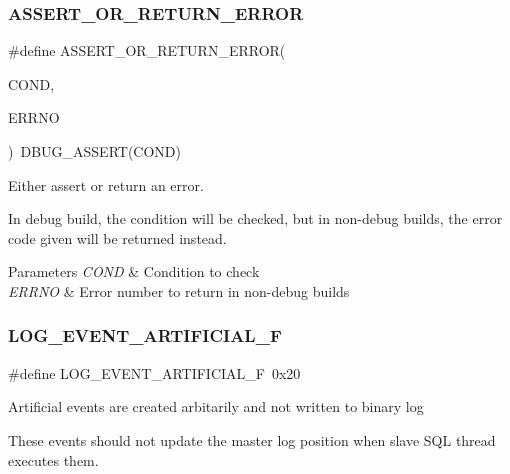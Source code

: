 \subsubsection{\texorpdfstring{A\+S\+S\+E\+R\+T\+\_\+\+O\+R\+\_\+\+R\+E\+T\+U\+R\+N\+\_\+\+E\+R\+R\+OR}{ASSERT\_OR\_RETURN\_ERROR}}
{\footnotesize\ttfamily \#define A\+S\+S\+E\+R\+T\+\_\+\+O\+R\+\_\+\+R\+E\+T\+U\+R\+N\+\_\+\+E\+R\+R\+OR(\begin{DoxyParamCaption}\item[{}]{C\+O\+ND,  }\item[{}]{E\+R\+R\+NO }\end{DoxyParamCaption})~D\+B\+U\+G\+\_\+\+A\+S\+S\+E\+RT(C\+O\+ND)}

Either assert or return an error.

In debug build, the condition will be checked, but in non-\/debug builds, the error code given will be returned instead.


\begin{DoxyParams}{Parameters}
{\em C\+O\+ND} & Condition to check \\
\hline
{\em E\+R\+R\+NO} & Error number to return in non-\/debug builds \\
\hline
\end{DoxyParams}
\mbox{\label{group__Replication_gae868eb0ba9f8e48fe19b405498d89444}} 
\subsubsection{\texorpdfstring{L\+O\+G\+\_\+\+E\+V\+E\+N\+T\+\_\+\+A\+R\+T\+I\+F\+I\+C\+I\+A\+L\+\_\+F}{LOG\_EVENT\_ARTIFICIAL\_F}}
{\footnotesize\ttfamily \#define L\+O\+G\+\_\+\+E\+V\+E\+N\+T\+\_\+\+A\+R\+T\+I\+F\+I\+C\+I\+A\+L\+\_\+F~0x20}

Artificial events are created arbitarily and not written to binary log

These events should not update the master log position when slave S\+QL thread executes them. \mbox{\label{group__Replication_gaa08db1b3439cffa93029dd40e1ddb2d4}} 
